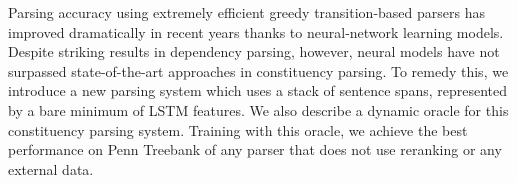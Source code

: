 Parsing accuracy using extremely efficient greedy transition-based parsers has improved dramatically in recent years thanks to neural-network learning models. Despite striking results in dependency parsing, however, neural models have not surpassed state-of-the-art approaches in constituency parsing. To remedy this, we introduce a new parsing system which uses a stack of sentence spans, represented by a bare minimum of LSTM features. We also describe a dynamic oracle for this constituency parsing system.  Training with this oracle, we achieve the best performance on Penn Treebank of any parser that does not use reranking or any external data.
